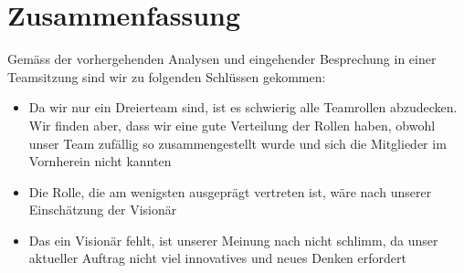 
\chapter{Zusammenfassung}

Gemäss der vorhergehenden Analysen und eingehender Besprechung in einer Teamsitzung sind wir zu folgenden Schlüssen gekommen:
\begin{itemize}
\item Da wir nur ein Dreierteam sind, ist es schwierig alle Teamrollen abzudecken. Wir finden aber, dass wir eine gute Verteilung der Rollen haben, obwohl unser Team zufällig so zusammengestellt wurde und sich die Mitglieder im Vornherein nicht kannten
\item Die Rolle, die am wenigsten ausgeprägt vertreten ist, wäre nach unserer Einschätzung der Visionär
\item Das ein Visionär fehlt, ist unserer Meinung nach nicht schlimm, da unser aktueller Auftrag nicht viel innovatives und neues Denken erfordert
\end{itemize}